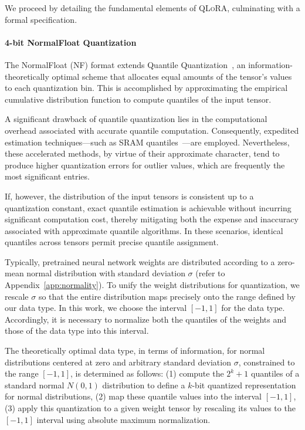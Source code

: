 We proceed by detailing the fundamental elements of \textsc{QLoRA}, culminating with a formal specification.

\paragraph{4-bit NormalFloat Quantization} The NormalFloat (NF) format extends Quantile Quantization~\citep{dettmers2022optimizers}, an information-theoretically optimal scheme that allocates equal amounts of the tensor's values to each quantization bin. This is accomplished by approximating the empirical cumulative distribution function to compute quantiles of the input tensor.

A significant drawback of quantile quantization lies in the computational overhead associated with accurate quantile computation. Consequently, expedited estimation techniques—such as SRAM quantiles~\citep{dettmers2022optimizers}—are employed. Nevertheless, these accelerated methods, by virtue of their approximate character, tend to produce higher quantization errors for outlier values, which are frequently the most significant entries.

If, however, the distribution of the input tensors is consistent up to a quantization constant, exact quantile estimation is achievable without incurring significant computation cost, thereby mitigating both the expense and inaccuracy associated with approximate quantile algorithms. In these scenarios, identical quantiles across tensors permit precise quantile assignment.

Typically, pretrained neural network weights are distributed according to a zero-mean normal distribution with standard deviation $\sigma$ (refer to Appendix~\ref{app:normality}). To unify the weight distributions for quantization, we rescale $\sigma$ so that the entire distribution maps precisely onto the range defined by our data type. In this work, we choose the interval $[-1, 1]$ for the data type. Accordingly, it is necessary to normalize both the quantiles of the weights and those of the data type into this interval.

The theoretically optimal data type, in terms of information, for normal distributions centered at zero and arbitrary standard deviation $\sigma$, constrained to the range $[-1, 1]$, is determined as follows: (1) compute the $2^k+1$ quantiles of a standard normal $N(0, 1)$ distribution to define a $k$-bit quantized representation for normal distributions, (2) map these quantile values into the interval $[-1, 1]$, (3) apply this quantization to a given weight tensor by rescaling its values to the $[-1, 1]$ interval using absolute maximum normalization.

